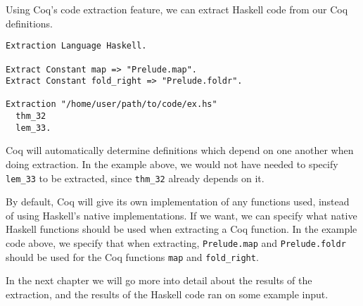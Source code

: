 Using Coq's code extraction feature, we can extract Haskell code from our Coq definitions.

\begin{minipage}{\linewidth}
\begin{lstlisting}[language=Coq, label={lst:extraction}, caption={Extraction of Coq definitions to Haskell}]
Extraction Language Haskell.

Extract Constant map => "Prelude.map".
Extract Constant fold_right => "Prelude.foldr".

Extraction "/home/user/path/to/code/ex.hs"
  thm_32
  lem_33.
\end{lstlisting}
\end{minipage}

Coq will automatically determine definitions which depend on one another when doing extraction.
In the example above, we would not have needed to specify \lstinline{lem_33} to be extracted,
since \lstinline{thm_32} already depends on it.

By default, Coq will give its own implementation of any functions used, instead of using
Haskell's native implementations. If we want, we can specify what native Haskell functions
should be used when extracting a Coq function. In the example code above,
we specify that when extracting, \lstinline[language=Haskell]{Prelude.map} and \lstinline[language=Haskell]{Prelude.foldr}
should be used for the Coq functions \lstinline{map} and \lstinline{fold_right}.

In the next chapter we will go more into detail about the results of the extraction,
and the results of the Haskell code ran on some example input.
